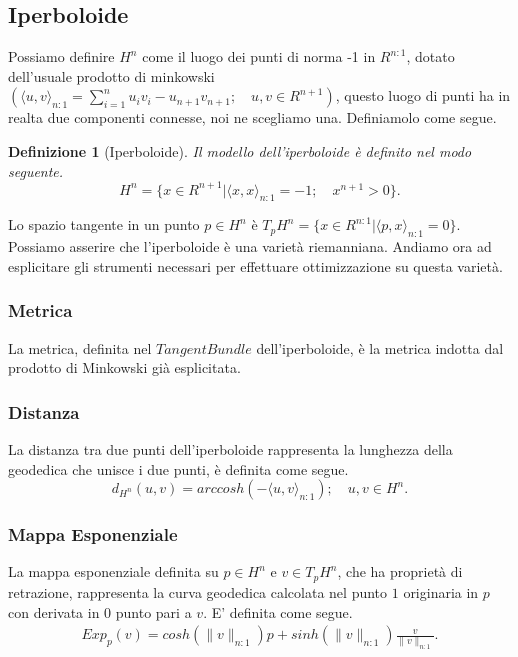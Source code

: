 \documentclass[a4paper, 12pt]{article}
\newtheorem{definition}{Definizione}
\begin{document}
\subsection{Iperboloide}
Possiamo definire $H^n$ come il luogo dei punti di norma -1 in $R^{n:1}$, dotato dell'usuale prodotto di minkowski $(\langle u, v \rangle_{n:1} = \sum_{i=1}^{n} u_iv_i - u_{n+1}v_{n+1}; \quad u,v \in R^{n+1})$, questo luogo di punti ha in realta due componenti connesse, noi ne scegliamo una. Definiamolo come segue.
\begin{definition}[Iperboloide]
Il modello dell'iperboloide è definito nel modo seguente.\\
\[H^n = \{x \in R^{n+1} | \langle x, x \rangle_{n:1} = -1; \quad x^{n+1} > 0 \}.\]
\end{definition}
Lo spazio tangente in un punto $p \in H^n$ è $T_pH^n = \{x \in R^{n:1} | \langle p,x \rangle_{n:1} = 0\}$.\\
Possiamo asserire che l'iperboloide è una varietà riemanniana. Andiamo ora ad esplicitare gli strumenti necessari per effettuare ottimizzazione su questa varietà.
\subsubsection{Metrica}
La metrica, definita nel $Tangent Bundle$ dell'iperboloide, è la metrica indotta dal prodotto di Minkowski già esplicitata.
\subsubsection{Distanza}
La distanza tra due punti dell'iperboloide rappresenta la lunghezza della geodedica che unisce i due punti, è definita come segue.\\
\[d_{H^n} (u,v) = arccosh(-\langle u, v \rangle_{n:1}); \quad u,v \in H^n.\]
\subsubsection{Mappa Esponenziale}
La mappa esponenziale definita su $p \in H^n$ e $v \in T_pH^n$, che ha proprietà di retrazione, rappresenta la curva geodedica calcolata nel punto $1$ originaria in $p$ con derivata in $0$ punto pari a $v$. E' definita come segue.\\
\begin{equation*}\begin{gathered}
Exp_p(v) = cosh(\parallel v \parallel_{n:1})p + sinh(\parallel v \parallel_{n:1}) \frac{v}{\parallel v \parallel_{n:1}}.
\end{gathered}\end{equation*}
\end{document}
